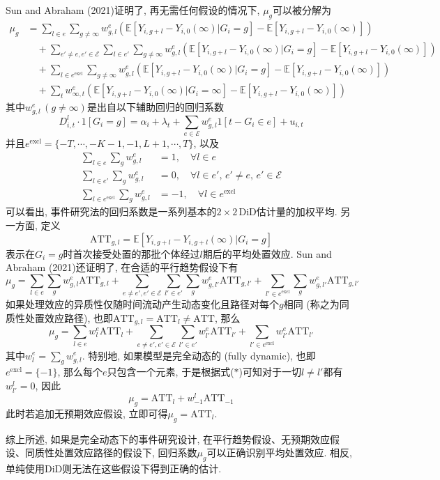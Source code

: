\documentclass[cn,blue,14pt,screen,bibstyle=gb7714-2015]{elegantnote}
\newcommand{\E}{\mathbb{E}}
\begin{document}
Sun and Abraham (2021)证明了, 再无需任何假设的情况下, $\mu_g$可以被分解为
\begin{align*}
\mu_g&=\sum_{l\in e}\sum_{g\neq\infty}w_{g,l}^e(\E[Y_{i,g+l}-Y_{i,0}(\infty)|G_i=g]-\E[Y_{i,g+l}-Y_{i,0}(\infty)]) \\
&\quad+\sum_{e'\neq e,e'\in\mathcal{E}}\sum_{l\in e'}\sum_{g\ne\infty}w_{g,l}^e(\E[Y_{i,g+l}-Y_{i,0}(\infty)|G_i=g]-\E[Y_{i,g+l}-Y_{i,0}(\infty)]) \\
&\quad +\sum_{l\in e^\text{excl}}\sum_{g\ne\infty}w_{g,l}^e(\E[Y_{i,g+l}-Y_{i,0}(\infty)|G_i=g]-\E[Y_{i,g+l}-Y_{i,0}(\infty)]) \\
&\quad+ \sum_tw_{\infty,t}^e(\E[Y_{i,g+l}-Y_{i,0}(\infty)|G_i=\infty]-\E[Y_{i,g+l}-Y_{i,0}(\infty)])
\end{align*}
其中$w_{g,l}^e\,(g\neq\infty)$是出自以下辅助回归的回归系数
$$D_{i,t}^l\cdot1[G_i=g]=\alpha_i+\lambda_t+\sum_{e\in\mathcal{E}}w_{g,l}^e1[t-G_i\in e]+u_{i,t}$$
并且$e^\text{excl}=\{-T,\cdots,-K-1,-1,L+1,\cdots,T\}$, 以及
\begin{align}
\sum_{l\in e}\sum_gw_{g,l}^e&=1,\quad\forall l\in e \nonumber \\
\sum_{l\in e'}\sum_gw_{g,l}^e&=0,\quad \forall l\in e',\, e'\neq e,\, e'\in\mathcal{E} \tag{$\ast$} \\
\sum_{l\in e^\text{excl}}\sum_gw_{g,l}^e&=-1,\quad\forall l\in e^\text{excl} \nonumber
\end{align}
可以看出, 事件研究法的回归系数是一系列基本的$2\times 2\,$DiD估计量的加权平均. 另一方面, 定义
$$\text{ATT}_{g,l}=\E[Y_{i,g+l}-Y_{i,g+l}(\infty)|G_i=g]$$
表示在$G_i=g$时首次接受处置的那批个体经过$l$期后的平均处置效应. Sun and Abraham (2021)还证明了, 在合适的平行趋势假设下有
$$\mu_g=\sum_{l\in e}\sum_gw_{g,l}^e\text{ATT}_{g,l}+\sum_{e\neq e',e'\in\mathcal{E}}\sum_{l'\in e'}\sum_g w_{g,l'}^e\text{ATT}_{g,l'}+\sum_{l'\in e^\text{excl}}\sum_gw_{g,l'}^e\text{ATT}_{g,l'}$$
如果处理效应的异质性仅随时间流动产生动态变化且路径对每个$g$相同 (称之为同质性处置效应路径), 也即$\text{ATT}_{g,l}=\text{ATT}_l\neq \text{ATT}$, 那么
$$\mu_g=\sum_{l\in e}w_{l}^e\text{ATT}_l+\sum_{e\neq e',e'\in\mathcal{E}}\sum_{l'\in e'} w_{l'}^e\text{ATT}_{l'}+\sum_{l'\in e^\text{excl}}w_{l'}^e\text{ATT}_{l'}$$
其中$w_l^e=\sum_gw_{g,l}^e$. 特别地, 如果模型是完全动态的 (fully dynamic), 也即$e^\text{excl}=\{-1\}$, 那么每个$e$只包含一个元素, 于是根据式($\ast$)可知对于一切$l\neq l'$都有$w_{l'}^l=0$, 因此
$$\mu_g=\text{ATT}_l+w_{-1}^l\text{ATT}_{-1}$$
此时若追加无预期效应假设, 立即可得$\mu_g=\text{ATT}_l$.

综上所述, 如果是完全动态下的事件研究设计, 在平行趋势假设、无预期效应假设、同质性处置效应路径的假设下, 回归系数$\mu_g$可以正确识别平均处置效应. 相反, 单纯使用DiD则无法在这些假设下得到正确的估计.
\end{document}

